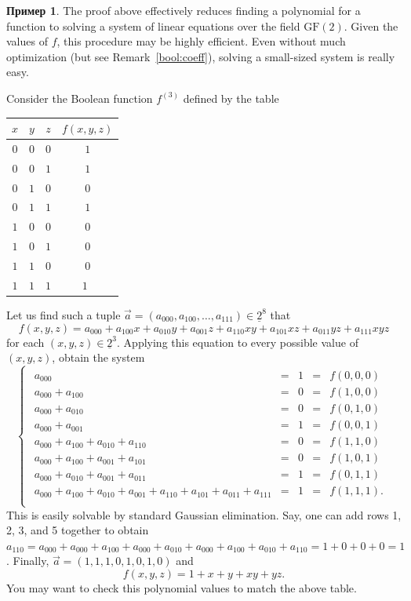 \documentclass[12pt,notitlepage]{article}
\theoremstyle{plain}
\theoremstyle{definition}
\newtheorem{exm}[thm]{Пример}
\theoremstyle{plain}
\newcommand{\ul}[1]{\underline{#1}}
\newcommand{\1}{\mathbf{1}}
\newcommand{\0}{\mathbf{0}}
\begin{document}
\begin{exm}
	The proof above effectively reduces finding a polynomial for a function to solving a system of linear equations over the field $\mathrm{GF}(2)$. Given the values of $f$, this procedure may be highly efficient. Even without much optimization (but see Remark~\ref{bool:coeff}), solving a small-sized system is really easy.
	
	Consider the Boolean function $f^{(3)}$ defined by the table
	\begin{center}
		\begin{tabular}{c c c | c }
			$x$&$y$&$z$&$f(x,y,z)$\\
			\hline
			$0$&$0$&$0$&$1$\\
			$0$&$0$&$1$&$1$\\
			$0$&$1$&$0$&$0$\\
			$0$&$1$&$1$&$1$\\
			
			$1$&$0$&$0$&$0$\\
			$1$&$0$&$1$&$0$\\
			$1$&$1$&$0$&$0$\\
			$1$&$1$&$1$&$1$\
		\end{tabular}
	\end{center}
	Let us find such a tuple $\vec a = (a_{000}, a_{100}, \ldots, a_{111}) \in \ul{2}^8$ that 
	$$f(x,y,z) = a_{000} + a_{100} x + a_{010} y + a_{001} z + a_{110} x y + a_{101} x z + a_{011} y z + a_{111} x y z$$
	for each $(x,y,z) \in \ul{2}^3$. Applying this equation to every possible value of $(x,y,z)$, obtain the system
	$$
	\begin{cases}
		\begin{array}{lcccr}
			a_{000}  &=& 1 &=& f(0,0,0)\\
			a_{000} + a_{100} &=& 0 &=& f(1,0,0)\\
			a_{000} + a_{010} &=& 0 &=& f(0,1,0)\\
			a_{000} + a_{001} &=& 1 &=& f(0,0,1)\\
			a_{000} + a_{100} + a_{010} + a_{110} &=& 0 &=& f(1,1,0)\\
			a_{000} + a_{100} + a_{001} + a_{101} &=& 0 &=& f(1,0,1)\\
			a_{000} + a_{010} + a_{001} + a_{011} &=& 1 &=& f(0,1,1)\\
			a_{000} + a_{100} + a_{010} + a_{001} + a_{110} + a_{101} + a_{011} + a_{111} &=& 1 &=& f(1,1,1).\\
		\end{array}
	\end{cases}
	$$
	This is easily solvable by standard Gaussian elimination. Say, one can add rows 1, 2, 3, and 5 together to obtain
	$a_{110} = a_{000} + a_{000} + a_{100} + a_{000} + a_{010} + a_{000} + a_{100} + a_{010} + a_{110} = 1 + 0 + 0 + 0 = 1$.
	Finally, $\vec a = (1, 1, 1, 0, 1, 0, 1, 0)$ and
	$$f(x,y,z) = 1 + x + y + xy + yz.$$
	You may want to check this polynomial values to match the above table.
\end{exm}
\end{document}
